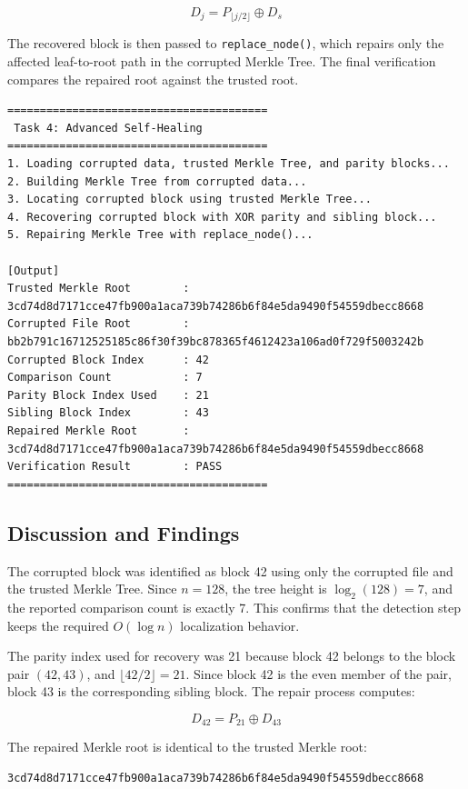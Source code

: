 \documentclass[11pt,a4paper]{article}
\begin{document}
\[
D_j = P_{\lfloor j/2 \rfloor} \oplus D_s
\]

The recovered block is then passed to \texttt{replace\_node()}, which repairs
only the affected leaf-to-root path in the corrupted Merkle Tree. The final
verification compares the repaired root against the trusted root.

\begin{lstlisting}
========================================
 Task 4: Advanced Self-Healing
========================================
1. Loading corrupted data, trusted Merkle Tree, and parity blocks...
2. Building Merkle Tree from corrupted data...
3. Locating corrupted block using trusted Merkle Tree...
4. Recovering corrupted block with XOR parity and sibling block...
5. Repairing Merkle Tree with replace_node()...

[Output]
Trusted Merkle Root        : 3cd74d8d7171cce47fb900a1aca739b74286b6f84e5da9490f54559dbecc8668
Corrupted File Root        : bb2b791c16712525185c86f30f39bc878365f4612423a106ad0f729f5003242b
Corrupted Block Index      : 42
Comparison Count           : 7
Parity Block Index Used    : 21
Sibling Block Index        : 43
Repaired Merkle Root       : 3cd74d8d7171cce47fb900a1aca739b74286b6f84e5da9490f54559dbecc8668
Verification Result        : PASS
========================================
\end{lstlisting}

\subsection{Discussion and Findings}

The corrupted block was identified as block 42 using only the corrupted file and
the trusted Merkle Tree. Since $n = 128$, the tree height is
$\log_2(128) = 7$, and the reported comparison count is exactly 7. This confirms
that the detection step keeps the required $O(\log n)$ localization behavior.

The parity index used for recovery was 21 because block 42 belongs to the block
pair $(42, 43)$, and $\lfloor 42/2 \rfloor = 21$. Since block 42 is the even
member of the pair, block 43 is the corresponding sibling block. The repair
process computes:

\[
D_{42} = P_{21} \oplus D_{43}
\]

The repaired Merkle root is identical to the trusted Merkle root:

\begin{lstlisting}
3cd74d8d7171cce47fb900a1aca739b74286b6f84e5da9490f54559dbecc8668
\end{lstlisting}
\end{document}
